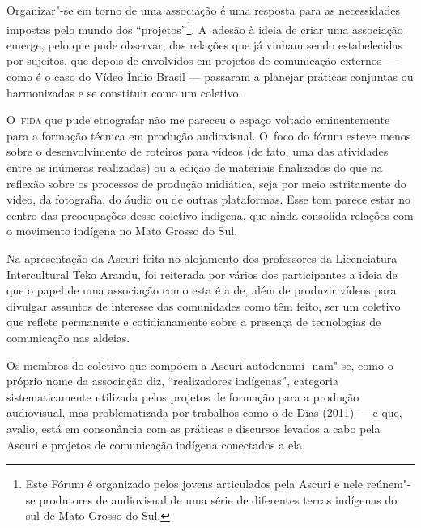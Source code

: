 Organizar"-se em torno de uma associação é uma resposta para as
necessidades impostas pelo mundo dos ``projetos''\footnote[11]{Este Fórum é
organizado pelos jovens articulados pela Ascuri e nele reúnem"-se
produtores de audiovisual de uma série de diferentes terras indígenas
do sul de Mato Grosso do Sul. }. A~adesão à ideia de criar uma
associação emerge, pelo que pude observar, das relações que já vinham
sendo estabelecidas por sujeitos, que depois de envolvidos em projetos
de comunicação externos --- como é o caso do Vídeo Índio Brasil ---
passaram a planejar práticas conjuntas ou harmonizadas e se constituir
como um coletivo.

O~\textsc{fida} que pude etnografar não me pareceu o espaço voltado eminentemente
para a formação técnica em produção audiovisual. O~foco do fórum esteve
menos sobre o desenvolvimento de roteiros para vídeos (de fato, uma das
atividades entre as inúmeras realizadas) ou a edição de materiais
finalizados do que na reflexão sobre os processos de produção
midiática, seja por meio estritamente do vídeo, da fotografia, do áudio
ou de outras plataformas. Esse tom parece estar no centro das
preocupações desse coletivo indígena, que ainda consolida relações com
o movimento indígena no Mato Grosso do Sul.

Na apresentação da Ascuri feita no alojamento dos professores da
Licenciatura Intercultural Teko Arandu, foi reiterada por vários dos
participantes a ideia de que o papel de uma associação como esta é a
de, além de produzir vídeos para divulgar assuntos de interesse das
comunidades como têm feito, ser um coletivo que reflete permanente e cotidianamente
sobre a presença de tecnologias de comunicação nas aldeias.

Os membros do coletivo que compõem a Ascuri autodenomi- nam"-se, como o
próprio nome da associação diz, ``realizadores indígenas'', categoria
sistematicamente utilizada pelos projetos de formação para a produção
audiovisual, mas problematizada por trabalhos como o de Dias (2011) --- e
que, avalio, está em consonância com as práticas e discursos levados a
cabo pela Ascuri e projetos de comunicação indígena conectados a ela.

